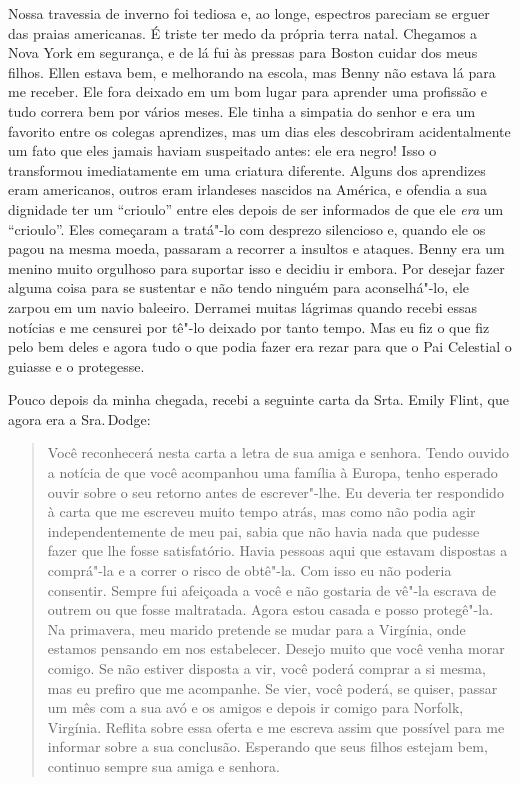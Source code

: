 Nossa travessia de inverno foi tediosa
e, ao longe, espectros pareciam se erguer das praias americanas. É
triste ter medo da própria terra natal. Chegamos a Nova York em
segurança, e de lá fui às pressas para Boston cuidar dos meus filhos.
Ellen estava bem, e melhorando na escola, mas Benny não estava lá para
me receber. Ele fora deixado em um bom lugar para aprender uma profissão
e tudo correra bem por vários meses. Ele tinha a simpatia do senhor e
era um favorito entre os colegas aprendizes, mas um dias eles
descobriram acidentalmente um fato que eles jamais haviam suspeitado
antes: ele era negro! Isso o transformou imediatamente em uma criatura
diferente. Alguns dos aprendizes eram americanos, outros eram irlandeses
nascidos na América, e ofendia a sua dignidade ter um ``crioulo'' entre
eles depois de ser informados de que ele \emph{era} um ``crioulo''. Eles
começaram a tratá"-lo com desprezo silencioso e, quando ele os pagou na
mesma moeda, passaram a recorrer a insultos e ataques. Benny era um
menino muito orgulhoso para suportar isso e decidiu ir embora. Por
desejar fazer alguma coisa para se sustentar e não tendo ninguém para
aconselhá"-lo, ele zarpou em um navio baleeiro. Derramei muitas lágrimas
quando recebi essas notícias e me censurei por tê"-lo deixado por tanto
tempo. Mas eu fiz o que fiz pelo bem deles e agora tudo o que podia
fazer era rezar para que o Pai Celestial o guiasse e o protegesse.

Pouco depois da minha chegada, recebi a
seguinte carta da Srta. Emily Flint, que agora era a Sra.\,Dodge:

\begin{quote}
Você reconhecerá nesta carta a letra de
sua amiga e senhora. Tendo ouvido a notícia de que você acompanhou uma
família à Europa, tenho esperado ouvir sobre o seu retorno antes de
escrever"-lhe. Eu deveria ter respondido à carta que me escreveu muito
tempo atrás, mas como não podia agir independentemente de meu pai, sabia
que não havia nada que pudesse fazer que lhe fosse satisfatório. Havia
pessoas aqui que estavam dispostas a comprá"-la e a correr o risco de
obtê"-la. Com isso eu não poderia consentir. Sempre fui afeiçoada a você
e não gostaria de vê"-la escrava de outrem ou que fosse maltratada. Agora
estou casada e posso protegê"-la. Na primavera, meu marido pretende se
mudar para a Virgínia, onde estamos pensando em nos estabelecer. Desejo
muito que você venha morar comigo. Se não estiver disposta a vir, você
poderá comprar a si mesma, mas eu prefiro que me acompanhe. Se vier,
você poderá, se quiser, passar um mês com a sua avó e os amigos e depois
ir comigo para Norfolk, Virgínia. Reflita sobre essa oferta e me escreva
assim que possível para me informar sobre a sua conclusão. Esperando que
seus filhos estejam bem, continuo sempre sua amiga e senhora.
\end{quote}

